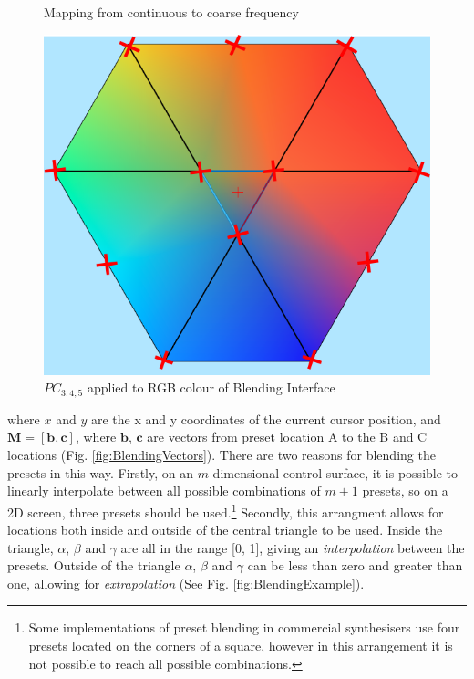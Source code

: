 \documentclass[11pt, oneside]{report}   	%
\renewcommand{\vec}[1]{\mathbf{#1}}
\begin{document}
\begin{figure}
	\caption{Mapping from continuous to coarse frequency}
	\label{fig:Freq Coarse}
	\includegraphics[width = \textwidth/3]{BlendingColours2.png}
	\caption{$PC_{3,4,5}$ applied to RGB colour of Blending Interface}
	\label{fig:BlendingColours}
	\vspace{-30pt}
\end{figure}
where $x$ and $y$ are the x and y coordinates of the current cursor position, and $\vec{M} =[\vec{b},  \vec{c}]$, where $\vec{b}$,  $\vec{c}$ are vectors from preset location A to the B and C locations (Fig. \ref{fig:BlendingVectors}). There are two reasons for blending the presets in this way. Firstly, on an $m$-dimensional control surface, it is possible to linearly interpolate between all possible combinations of $m+1$ presets, so on a 2D screen, three presets should be used.\footnote{Some implementations of preset blending in commercial synthesisers use four presets located on the corners of a square, however in this arrangement it is not possible to reach all possible combinations.} Secondly, this arrangment allows for locations both inside and outside of the central triangle to be used. Inside the triangle, $\alpha$, $\beta$ and $\gamma$ are all in the range [0, 1], giving an \emph{interpolation} between the presets. Outside of the triangle $\alpha$, $\beta$ and $\gamma$ can be less than zero and greater than one, allowing for \emph{extrapolation} (See Fig. \ref{fig:BlendingExample}).
\end{document}
